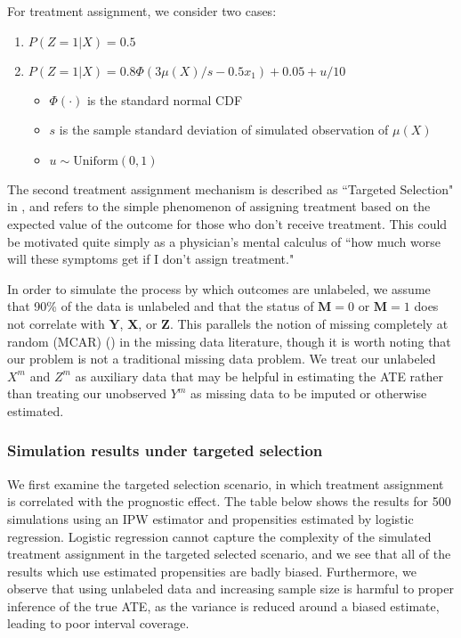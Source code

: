 \documentclass[aos]{imsart}
\newcommand{\X}{\mathbf{X}}
\newcommand{\M}{\mathbf{M}}
\newcommand{\Y}{\mathbf{Y}}
\newcommand{\Z}{\mathbf{Z}}
\begin{document}
For treatment assignment, we consider two cases:

\begin{enumerate}
\item $P(Z = 1 | X) = 0.5$
\item $P(Z = 1 | X) = 0.8\Phi(3 \mu(X) / s - 0.5 x_1) + 0.05 + u / 10$
\begin{itemize}
	\item $\Phi(\cdot)$ is the standard normal CDF
	\item $s$ is the sample standard deviation of simulated observation of $\mu(X)$
	\item $u \sim \mathrm{Uniform}(0, 1)$ 
\end{itemize}
\end{enumerate}

The second treatment assignment mechanism is described as ``Targeted Selection" in \cite{hahn2017bayesian}, and 
refers to the simple phenomenon of assigning treatment based on the expected value of the outcome for those who don't receive 
treatment. This could be motivated quite simply as a physician's mental calculus of ``how much worse will these symptoms get if I don't 
assign treatment."

In order to simulate the process by which outcomes are unlabeled, we assume that 90\% of the data is unlabeled and that the status of $\M = 0$ or $\M = 1$
does not correlate with $\Y$, $\X$, or $\Z$. This parallels the notion of missing completely at random (MCAR) (\cite{little2019statistical}) in the missing data 
literature, though it is worth noting that our problem is not a traditional missing data problem. We treat our unlabeled $X^m$ and $Z^m$ as auxiliary data that 
may be helpful in estimating the ATE rather than treating our unobserved $Y^m$ as missing data to be imputed or otherwise estimated.

\subsubsection{Simulation results under targeted selection}

We first examine the targeted selection scenario, in which treatment assignment is correlated with the 
prognostic effect. The table below shows the results for 500 simulations using an IPW estimator and propensities 
estimated by logistic regression. Logistic regression cannot capture the complexity of the simulated 
treatment assignment in the targeted selected scenario, and we see that all of the results 
which use estimated propensities are badly biased. Furthermore, we observe that using unlabeled data 
and increasing sample size is harmful to proper inference of the true ATE, as the variance is reduced 
around a biased estimate, leading to poor interval coverage.
\end{document}
